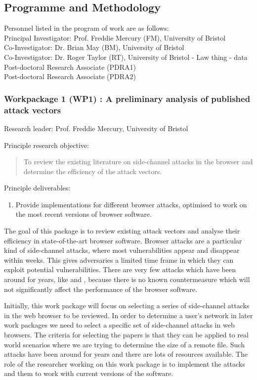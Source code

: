 \documentclass[a4paper,11pt]{article}
\begin{document}
\subsection*{Programme and Methodology}
Personnel listed in the program of work are as follows:\\
Principal Investigator: Prof. Freddie Mercury (FM), University of Bristol\\
Co-Investigator: Dr. Brian May (BM), University of Bristol\\
Co-Investigator: Dr. Roger Taylor (RT), University of Bristol - Law thing - data \\
Post-doctoral Research Associate (PDRA1)\\
Post-doctoral Research Associate (PDRA2)\\

\subsubsection*{Workpackage 1 (WP1) : A preliminary analysis of published attack vectors}
Research leader: Prof. Freddie Mercury, University of Bristol

Principle research objective:
\begin{quote}
	To review the existing literature on side-channel attacks in the browser and determine the efficiency of the attack vectors.
\end{quote}

Principle deliverables:
\begin{enumerate}
\item Provide implementations for different browser attacks, optimised to work on the most recent versions of browser software.
\end{enumerate}

The goal of this package is to review existing attack vectors and analyse their efficiency in state-of-the-art browser software. Browser attacks are a particular kind of side-channel attacks, where most vulnerabilities appear and disappear within weeks. This gives adversaries a limited time frame in which they can exploit potential vulnerabilities. There are very few attacks which have been around for years, like \cite{felten2000timing} and \cite{bortz2007exposing}, because there is no known countermeasure which will not significantly affect the performance of the browser software.

Initially, this work package will focus on selecting a series of side-channel attacks in the web browser to be reviewed. In order to determine a user's network in later work packages we need to select a specific set of side-channel attacks in web browsers. The criteria for selecting the papers is that they can be applied to real world scenarios where we are trying to determine the size of a remote file. Such attacks have been around for years and there are lots of resources available. The role of the researcher working on this work package is to implement the attacks and them to work with current versions of the software. 
\end{document}
